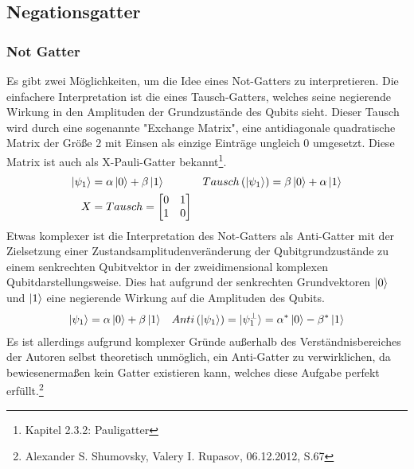 \documentclass[12pt]{report}
\begin{document}
\subsection{Negationsgatter}	%
\subsubsection{Not Gatter}			%
Es gibt zwei Möglichkeiten, um die Idee eines Not-Gatters zu interpretieren.
Die einfachere Interpretation ist die eines Tausch-Gatters, welches seine negierende Wirkung in den Amplituden der Grundzustände des Qubits sieht. Dieser Tausch wird durch eine sogenannte "Exchange Matrix", eine antidiagonale quadratische Matrix der Größe 2 mit Einsen als einzige Einträge ungleich 0 umgesetzt. Diese Matrix ist auch als X-Pauli-Gatter bekannt\footnote{Kapitel 2.3.2: Pauligatter}.
\begin{align*}
	\ket{\psi_1} &= \alpha\ket{0} + \beta\ket{1} &
	Tausch\left(\ket{\psi_1}\right) &= \beta\ket{0} + \alpha\ket{1}\\
	X &= Tausch = \begin{bmatrix} 0&1\\1&0 \end{bmatrix} 
\end{align*}
Etwas komplexer ist die Interpretation des Not-Gatters als Anti-Gatter mit der Zielsetzung einer Zustandsamplitudenveränderung der Qubitgrundzustände zu einem senkrechten Qubitvektor in der zweidimensional komplexen Qubitdarstellungsweise. Dies hat aufgrund der senkrechten Grundvektoren $\ket{0}$ und $\ket{1}$ eine negierende Wirkung auf die Amplituden des Qubits.
\begin{align*}
	\ket{\psi_1} &= \alpha\ket{0} + \beta\ket{1} &
	Anti\left(\ket{\psi_1}\right) = \ket{\psi_1^{\perp}} &= \alpha^*\ket{0} - \beta^*\ket{1}\\
\end{align*}
Es ist allerdings aufgrund komplexer Gründe außerhalb des Verständnisbereiches der Autoren selbst theoretisch unmöglich, ein Anti-Gatter zu verwirklichen, da bewiesenermaßen kein Gatter existieren kann, welches diese Aufgabe perfekt erfüllt.\footnote{Alexander S. Shumovsky, Valery I. Rupasov, 06.12.2012, S.67}
\end{document}
